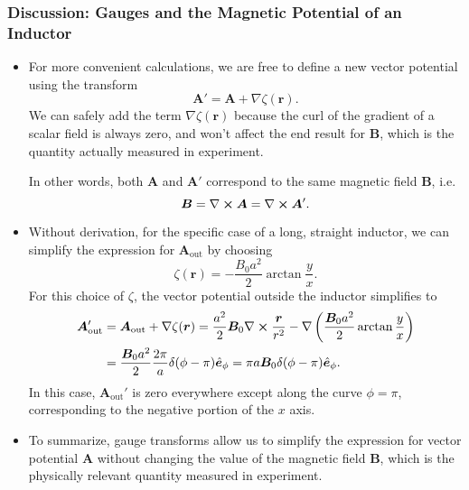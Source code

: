 \documentclass[11pt, a4paper]{article}
\renewcommand{\vec}[1]{\bm{#1}} %
\newcommand{\uvec}[1]{\hat{\vec{#1}}} %
\renewcommand{\r}{\vec{r}}
\newcommand{\B}{\vec{B}} %
\newcommand{\A}{\vec{A}} %
\renewcommand{\curl}{\nabla \cross}
\renewcommand{\grad}{\nabla}
\begin{document}
\subsubsection{Discussion: Gauges and the Magnetic Potential of an Inductor}
\begin{itemize}
	
	
	\item For more convenient calculations, we are free to define a new vector potential using the transform
	\begin{equation*}
		\A' = \A + \grad \zeta (\r).
	\end{equation*}
	We can safely add the term $ \grad \zeta (\r) $ because the curl of the gradient of a scalar field is always zero, and won't affect the end result for $ \B $, which is the quantity actually measured in experiment.

    In other words, both $ \A $ and $ \A' $ correspond to the same magnetic field $ \B $, i.e.
	\begin{equation*}
		\B = \curl \A = \curl \A'.
	\end{equation*}
	
	\item Without derivation, for the specific case of a long, straight inductor, we can simplify the expression for $ \A_{\text{out}} $ by choosing
	\begin{equation*}
		\zeta (\r)  = -\frac{B_{0}a^{2}}{2} \arctan \frac{y}{x}.
	\end{equation*}
	For this choice of $ \zeta $, the vector potential outside the inductor simplifies to
	\begin{align*}
		\A_{\text{out}}' &= \A_{\text{out}} + \grad \zeta (\r) = \frac{a^{2}}{2}\B_{0}\curl \frac{\r}{r^{2}} - \grad \left(\frac{\B_{0}a^{2}}{2} \arctan \frac{y}{x}\right)\\
        & = \frac{\B_{0}a^{2}}{2} \frac{2\pi}{a} \delta (\phi - \pi) \uvec{e}_{\phi} = \pi a \B_{0} \delta(\phi - \pi) \uvec{e}_{\phi}.
	\end{align*}
	In this case, $ \A_{\text{out}}' $ is zero everywhere except along the curve $ \phi = \pi $, corresponding to the negative portion of the $ x $ axis.
	
	\item To summarize, gauge transforms allow us to simplify the expression for vector potential $ \A $ without changing the value of the magnetic field $ \B $, which is the physically relevant quantity measured in experiment.
\end{itemize}
\end{document}
